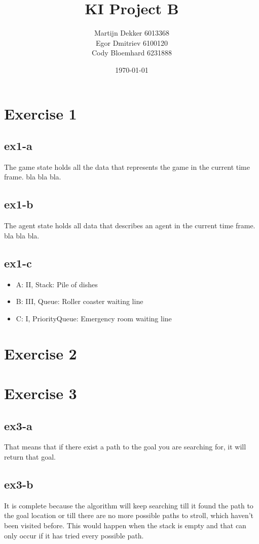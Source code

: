 \documentclass[a4paper]{article}
\title{KI Project B}
\author{
Martijn Dekker  6013368 \\
Egor Dmitriev   6100120 \\
Cody Bloemhard  6231888 \\
}
\date{\today}
\begin{document}
\maketitle

\section{Exercise 1}
\label{sec:ex1}
\subsection{ex1-a}
The game state holds all the data that represents the game in the current time frame. bla bla bla.
\subsection{ex1-b}
The agent state holds all data that describes an agent in the current time frame. bla bla bla.
\subsection{ex1-c}
\begin{itemize}
\item A: II, Stack: Pile of dishes
\item B: III, Queue: Roller coaster waiting line
\item C: I, PriorityQueue: Emergency room waiting line
\end{itemize}

\section{Exercise 2}
\subsection{}


\section{Exercise 3}
\subsection{ex3-a}
That means that if there exist a path to the goal you are searching for, it will return that goal.

\subsection{ex3-b}
It is complete because the algorithm will keep searching till it found the path to the goal location or till there are no more 
possible paths to stroll, which haven't been visited before. This would happen when the stack is empty 
and that can only occur if it has tried every possible path.
\end{document}
